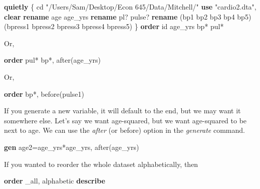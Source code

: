 \documentclass[
]{book}
\newenvironment{Shaded}{\begin{snugshade}}{\end{snugshade}}
\newcommand{\DataTypeTok}[1]{\textcolor[rgb]{0.13,0.29,0.53}{#1}}
\newcommand{\KeywordTok}[1]{\textcolor[rgb]{0.13,0.29,0.53}{\textbf{#1}}}
\newcommand{\NormalTok}[1]{#1}
\newcommand{\StringTok}[1]{\textcolor[rgb]{0.31,0.60,0.02}{#1}}
\begin{document}
\begin{Shaded}
\begin{Highlighting}[]
\KeywordTok{quietly}\NormalTok{ \{}
\NormalTok{cd }\StringTok{"/Users/Sam/Desktop/Econ 645/Data/Mitchell/"}
\KeywordTok{use} \StringTok{"cardio2.dta"}\NormalTok{, }\KeywordTok{clear}
\KeywordTok{rename}\NormalTok{ age age\_yrs}
\KeywordTok{rename}\NormalTok{ pl? pulse? }
\KeywordTok{rename}\NormalTok{ (bp1 bp2 bp3 bp4 bp5) (bpress1 bpress2 bpress3 bpress4 bpress5)}
\NormalTok{\}}
\KeywordTok{order}\NormalTok{ id age\_yrs bp* pul*}
\end{Highlighting}
\end{Shaded}

Or,

\begin{Shaded}
\begin{Highlighting}[]
\KeywordTok{order}\NormalTok{ pul* bp*, after(age\_yrs) }
\end{Highlighting}
\end{Shaded}

Or,

\begin{Shaded}
\begin{Highlighting}[]
\KeywordTok{order}\NormalTok{ bp*, before(pulse1)}
\end{Highlighting}
\end{Shaded}

If you generate a new variable, it will default to the end, but we may want it somewhere else. Let's say we want age-squared, but we want age-squared to be next to age. We can use the \emph{after} (or before) option in the \emph{generate} command.

\begin{Shaded}
\begin{Highlighting}[]
\KeywordTok{gen}\NormalTok{ age2=age\_yrs*age\_yrs, after(age\_yrs)}
\end{Highlighting}
\end{Shaded}

If you wanted to reorder the whole dataset alphabetically, then

\begin{Shaded}
\begin{Highlighting}[]
\KeywordTok{order} \DataTypeTok{\_all}\NormalTok{, alphabetic}
\KeywordTok{describe}
\end{Highlighting}
\end{Shaded}
\end{document}
